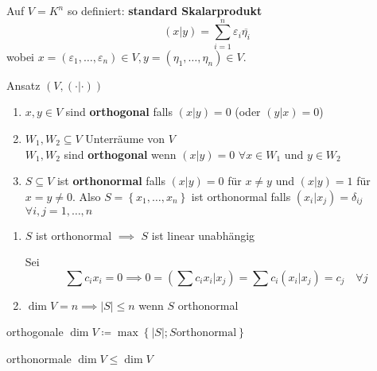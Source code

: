 \begin{subexample}
	Auf $ V = K^n $ so definiert: \textbf{standard Skalarprodukt}
	\[
		(x|y) = \sum_{i=1}^{n} \varepsilon _i \overline{\eta_i} 
	\]
	wobei $ x = \left( \varepsilon _1, \dotsc, \varepsilon _n \right) \in V, y = (\eta_1, \dotsc, \eta_n) \in V $.
\end{subexample}

\begin{subdefinition}
	Ansatz $ \left( V, ( \cdot | \cdot ) \right)  $ 
	\begin{enumerate}[label=(\roman*)]
		\item $ x, y \in V $ sind \textbf{orthogonal} falls $ (x|y) = 0 $ (oder $ (y|x) = 0 $)
		\item $ W_1, W_2 \subseteq V $ Unterräume von $ V $\\
			$ W_1, W_2 $ sind \textbf{orthogonal} wenn $ (x|y) = 0 $ $ \forall x \in W_1 $ und $ y \in W_2 $ 
		\item $ S \subseteq V $ ist \textbf{orthonormal} falls $ (x|y) = 0 $ für $ x \neq y $ und $ (x|y) = 1 $ für $ x = y \neq 0 $.
			Also $ S = \left\{ x_1, \dotsc, x_n \right\}  $ ist orthonormal falls $ (x_i|x_j) = \delta_{ij} $ $ \forall i, j = 1, \dotsc, n $
	\end{enumerate}
\end{subdefinition}

\begin{subnote}
	\begin{enumerate}[label=(\roman*)]
		\item $ S  $ ist orthonormal $ \implies  $ $ S $ ist linear unabhängig
			\begin{subproof*}
				Sei
				\[
					\sum c_i x_i = 0 \implies 0 = \left( \sum c_ix_i|x_j \right) = \sum c_i (x_i|x_j) = c_j \quad \forall j
				\]
				
			\end{subproof*}
		\item $ \dim V = n \implies  \left| S \right| \leq n $ wenn $ S $ orthonormal
	\end{enumerate}
\end{subnote}

\begin{subnote}
	orthogonale $ \dim V \coloneqq \max \left\{ \left| S \right| ; S \text{orthonormal}  \right\}  $
\end{subnote}

\begin{subnote}
	orthonormale $ \dim V \leq \dim V $
\end{subnote}

